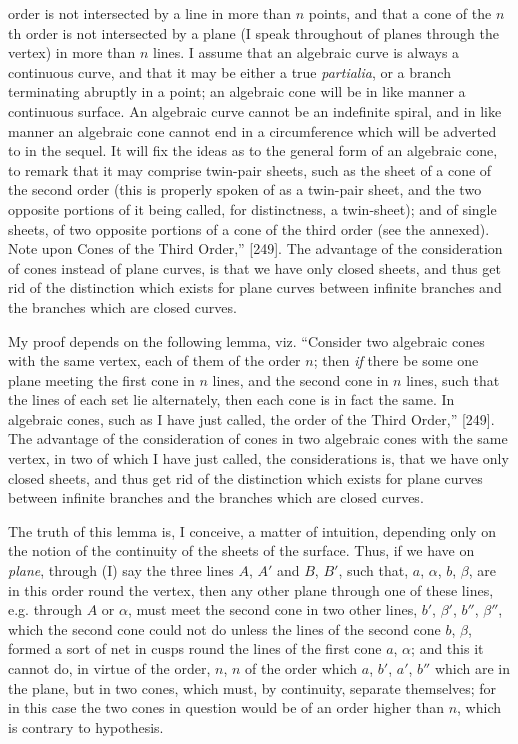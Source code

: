 \documentclass[11pt,a4paper]{article}
\begin{document}
order is not intersected by a line in more than $n$ points, and that a cone of the $n$th order is not intersected by a plane (I speak throughout of planes through the vertex) in more than $n$ lines. I assume that an algebraic curve is always a continuous curve, and that it may be either a true \textit{partialia}, or a branch terminating abruptly in a point; an algebraic cone will be in like manner a continuous surface. An algebraic curve cannot be an indefinite spiral, and in like manner an algebraic cone cannot end in a circumference which will be adverted to in the sequel. It will fix the ideas as to the general form of an algebraic cone, to remark that it may comprise twin-pair sheets, such as the sheet of a cone of the second order (this is properly spoken of as a twin-pair sheet, and the two opposite portions of it being called, for distinctness, a twin-sheet); and of single sheets, of two opposite portions of a cone of the third order (see the annexed). Note upon Cones of the Third Order,'' [249]. The advantage of the consideration of cones instead of plane curves, is that we have only closed sheets, and thus get rid of the distinction which exists for plane curves between infinite branches and the branches which are closed curves.

My proof depends on the following lemma, viz. ``Consider two algebraic cones with the same vertex, each of them of the order $n$; then \textit{if} there be some one plane meeting the first cone in $n$ lines, and the second cone in $n$ lines, such that the lines of each set lie alternately, then each cone is in fact the same. In algebraic cones, such as I have just called, the order of the Third Order,'' [249]. The advantage of the consideration of cones in two algebraic cones with the same vertex, in two of which I have just called, the considerations is, that we have only closed sheets, and thus get rid of the distinction which exists for plane curves between infinite branches and the branches which are closed curves.

The truth of this lemma is, I conceive, a matter of intuition, depending only on the notion of the continuity of the sheets of the surface. Thus, if we have on \textit{plane}, through (I) say the three lines $A$, $A'$ and $B$, $B'$, such that, $a$, $\alpha$, $b$, $\beta$, are in this order round the vertex, then any other plane through one of these lines, e.g. through $A$ or $\alpha$, must meet the second cone in two other lines, $b'$, $\beta'$, $b''$, $\beta''$, which the second cone could not do unless the lines of the second cone $b$, $\beta$, formed a sort of net in cusps round the lines of the first cone $a$, $\alpha$; and this it cannot do, in virtue of the order, $n$, $n$ of the order which $a$, $b'$, $a'$, $b''$ which are in the plane, but in two cones, which must, by continuity, separate themselves; for in this case the two cones in question would be of an order higher than $n$, which is contrary to hypothesis.
\end{document}
